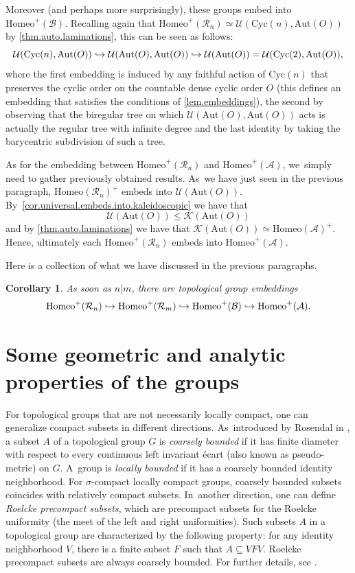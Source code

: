 \documentclass[JEP,XML,SOM,Unicode,NoFloatCountersInSection,published]{cedram}
\newcommand\hto{\mathrel{\lhook\joinrel\to}}
\theoremstyle{plain}
\newtheorem{corollary}[theorem]{Corollary}
\theoremstyle{definition}
\theoremstyle{remark}
\newcommand{\Aut}{\mathrm{Aut}}
\newcommand{\Cyc}{\mathrm{Cyc}}
\newcommand{\Homeo}{\mathrm{Homeo}}
\newcommand{\A}{\mathcal{A}}
\newcommand{\B}{\mathcal{B}}
\newcommand{\R}{\mathcal{R}}
\newcommand{\U}{\mathcal{U}}
\newcommand{\K}{\mathcal{K}}
\begin{document}
Moreover (and perhaps more surprisingly), these groups embed into $\Homeo^+(\B)$.
Recalling again that $\Homeo^+(\R_n) \simeq \U(\Cyc(n),\Aut(O))$ by \cref{thm.auto.laminations}, this can be seen as follows:\vspace*{-3pt}
\[
\U(\Cyc(n),\Aut(O)) \hto \U(\Aut(O),\Aut(O))
\hto \U(\Aut(O)) = \U(\Cyc(2),\Aut(O)) ,
\]
where the first embedding is induced by any faithful action of $\Cyc(n)$ that preserves the cyclic order on the countable dense cyclic order $O$ (this defines an embedding that satisfies the conditions of \cref{lem.embeddings}), the second by observing that the biregular tree on which $\U(\Aut(O),\Aut(O))$ acts is actually the regular tree with infinite degree and the last identity by taking the barycentric subdivision of such a tree.

As for the embedding between $\Homeo^+(\R_n)$ and $\Homeo^+(\A)$, we~simply need to gather previously obtained results. As~we have just seen in the previous paragraph, $\Homeo(\R_n)^+$ embeds into $\U(\Aut(O))$. By~\cref{cor.universal.embeds.into.kaleidoscopic} we have that\vspace*{-3pt}
\[
\U(\Aut(O)) \leq \K(\Aut(O))
\]
and by \cref{thm.auto.laminations} we have that $\K(\Aut(O)) \simeq \Homeo(\A)^+$.
Hence, ultimately each $\Homeo^+(\R_n)$ embeds into $\Homeo^+(\A)$.

Here is a collection of what we have discussed in the previous paragraphs.

\begin{corollary}
As soon as $n|m$, there are topological group embeddings
\[
 \Homeo^+(\R_n) \hto \Homeo^+(\R_m) \hto \Homeo^+(\B) \hto \Homeo^+(\A). 
\]
\end{corollary}

\section{Some geometric and analytic properties of the groups}
\label{sec.geometric.analytic.properties}

For topological groups that are not necessarily locally compact, one can generalize compact subsets in different directions. As~introduced by Rosendal in \cite{MR4327092}, a subset $A$ of a topological group $G$ is \emph{coarsely bounded} if it has finite diameter with respect to every continuous left invariant écart (also known as pseudo-metric) on $G$. A~group is \emph{locally bounded} if it has a coarsely bounded identity neighborhood.
For $\sigma$-compact locally compact groups, coarsely bounded subsets coincides with relatively compact subsets. In~another direction, one can define \emph{Roelcke precompact subsets}, which are precompact subsets for the Roelcke uniformity (the meet of the left and right uniformities).
Such subsets $A$ in a topological group are characterized by the following property:
for any identity neighborhood $V$, there is a finite subset $F$ such that $A\subseteq VFV$.
Roelcke precompact subsets are always coarsely bounded.
For further details, see \cite[\S 3]{MR3707816}.
\end{document}
